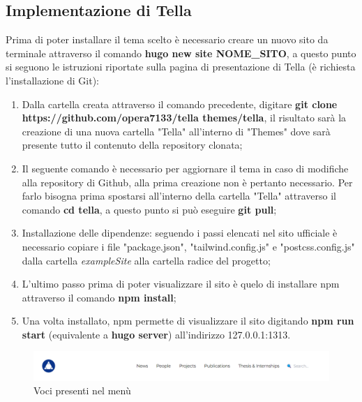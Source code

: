 \documentclass[target=bach,aauheader=]{thud}
\begin{document}
\subsection{Implementazione di Tella}
Prima di poter installare il tema scelto è necessario creare un nuovo sito da terminale attraverso il comando \textbf{hugo new site NOME\_SITO}, a questo punto si seguono le istruzioni riportate sulla pagina di presentazione di Tella (è richiesta l'installazione di Git):
\begin{enumerate}
    \item Dalla cartella creata attraverso il comando precedente, digitare \newline \textbf{git clone https://github.com/opera7133/tella themes/tella}, il risultato sarà la creazione di una nuova cartella "Tella" all'interno di "Themes" dove sarà presente tutto il contenuto della repository clonata;
    \item Il seguente comando è necessario per aggiornare il tema in caso di modifiche alla repository di Github, alla prima creazione non è pertanto necessario. Per farlo bisogna prima spostarsi all'interno della cartella "Tella" attraverso il comando \textbf{cd tella}, a questo punto si può eseguire \textbf{git pull};
    \item Installazione delle dipendenze: seguendo i passi elencati nel sito ufficiale è necessario copiare i file "package.json", "tailwind.config.js" e "postcss.config.js" dalla cartella \textit{exampleSite} alla cartella radice del progetto;
    \item L'ultimo passo prima di poter visualizzare il sito è quelo di installare npm attraverso il comando \textbf{npm install};
    \item Una volta installato, npm permette di visualizzare il sito digitando \textbf{npm run start} (equivalente a \textbf{hugo server}) all'indirizzo 127.0.0.1:1313.
\end{enumerate}

\begin{figure}[b]
    \centering
    \includegraphics[width = 1\textwidth]{images/Tella-menu.png}
    \caption{Voci presenti nel menù}
    \label{img:menu}
\end{figure}
\end{document}
